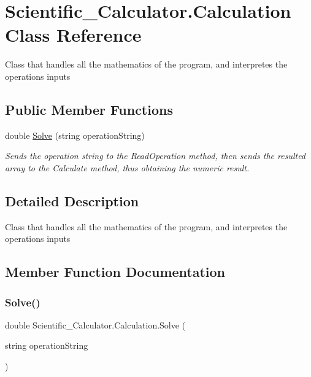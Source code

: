 \hypertarget{class_scientific___calculator_1_1_calculation}{}\section{Scientific\+\_\+\+Calculator.\+Calculation Class Reference}
\label{class_scientific___calculator_1_1_calculation}


Class that handles all the mathematics of the program, and interpretes the operations inputs  


\subsection*{Public Member Functions}
\begin{DoxyCompactItemize}
\item 
double \hyperlink{class_scientific___calculator_1_1_calculation_ab4879c2e7890c6dfd7e954e6c424764f}{Solve} (string operation\+String)
\begin{DoxyCompactList}\small\item\em Sends the operation string to the Read\+Operation method, then sends the resulted array to the Calculate method, thus obtaining the numeric result. \end{DoxyCompactList}\end{DoxyCompactItemize}


\subsection{Detailed Description}
Class that handles all the mathematics of the program, and interpretes the operations inputs 



\subsection{Member Function Documentation}
\mbox{\label{class_scientific___calculator_1_1_calculation_ab4879c2e7890c6dfd7e954e6c424764f}} 
\subsubsection{\texorpdfstring{Solve()}{Solve()}}
{\footnotesize\ttfamily double Scientific\+\_\+\+Calculator.\+Calculation.\+Solve (\begin{DoxyParamCaption}\item[{string}]{operation\+String }\end{DoxyParamCaption})}



